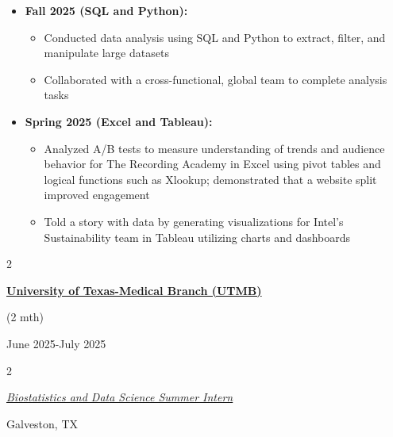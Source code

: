 \documentclass[
  16,
]{article}
\providecommand{\tightlist}{%
  \setlength{\itemsep}{0pt}\setlength{\parskip}{0pt}}
\begin{document}
\begin{itemize}
\item
  \textbf{Fall 2025 (SQL and Python):}

  \begin{itemize}
  \tightlist
  \item
    Conducted data analysis using SQL and Python to extract, filter, and
    manipulate large datasets
  \item
    Collaborated with a cross-functional, global team to complete
    analysis tasks
  \end{itemize}
\item
  \textbf{Spring 2025 (Excel and Tableau):}

  \begin{itemize}
  \item
    Analyzed A/B tests to measure understanding of trends and audience
    behavior for The Recording Academy in Excel using pivot tables and
    logical functions such as Xlookup; demonstrated that a website split
    improved engagement
  \item
    Told a story with data by generating visualizations for Intel's
    Sustainability team in Tableau utilizing charts and dashboards
  \end{itemize}
\end{itemize}

\vspace{3pt}

\begin{large}
  \begin{multicols}{2}
    \begin{flushleft}{\bf \href{https://www.utmb.edu/spph/department/of-biostatistics-data-science/programs-training/summer-institute}{University of Texas-Medical Branch (UTMB)}}\end{flushleft}
    \begin{flushright}
    \begin{small}(2 mth)\end{small}
    June 2025-July 2025\end{flushright}
  \end{multicols}
  \vspace{-0.17cm}
  \begin{multicols}{2}
    \begin{flushleft}
  \textit{\href{https://youtu.be/dCCRvg9enWI}{Biostatistics and Data Science Summer Intern}}
  \end{flushleft}
    \begin{flushright}Galveston, TX\end{flushright}\end
  {multicols}
\end{large}
\vspace{-0.16cm}
\end{document}
